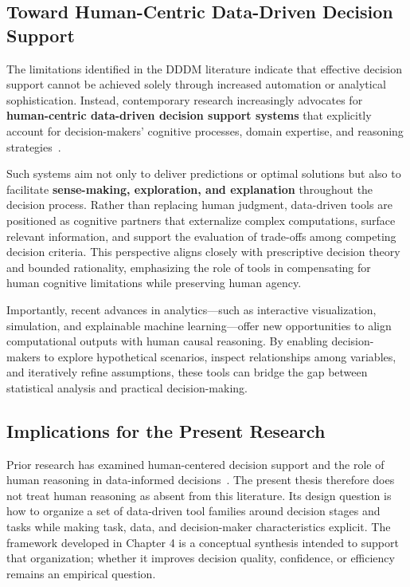 \documentclass{sfuthesis}
\begin{document}
\subsection{Toward Human-Centric Data-Driven Decision Support}
The limitations identified in the DDDM literature indicate that effective decision support cannot be achieved solely through increased automation or analytical sophistication. Instead, contemporary research increasingly advocates for \textbf{human-centric data-driven decision support systems} that explicitly account for decision-makers’ cognitive processes, domain expertise, and reasoning strategies~\cite{brandas_data_2016,hayn_predictive_2018}.\par
Such systems aim not only to deliver predictions or optimal solutions but also to facilitate \textbf{sense-making, exploration, and explanation} throughout the decision process. Rather than replacing human judgment, data-driven tools are positioned as cognitive partners that externalize complex computations, surface relevant information, and support the evaluation of trade-offs among competing decision criteria. This perspective aligns closely with prescriptive decision theory and bounded rationality, emphasizing the role of tools in compensating for human cognitive limitations while preserving human agency.\par
Importantly, recent advances in analytics—such as interactive visualization, simulation, and explainable machine learning—offer new opportunities to align computational outputs with human causal reasoning. By enabling decision-makers to explore hypothetical scenarios, inspect relationships among variables, and iteratively refine assumptions, these tools can bridge the gap between statistical analysis and practical decision-making.
\subsection{Implications for the Present Research}
Prior research has examined human-centered decision support and the role of human reasoning in data-informed decisions~\cite{brandas_data_2016,hayn_predictive_2018,zaimoglu2023epistemological,pratt_bringing_2023}. The present thesis therefore does not treat human reasoning as absent from this literature. Its design question is how to organize a set of data-driven tool families around decision stages and tasks while making task, data, and decision-maker characteristics explicit. The framework developed in Chapter 4 is a conceptual synthesis intended to support that organization; whether it improves decision quality, confidence, or efficiency remains an empirical question.
\end{document}
